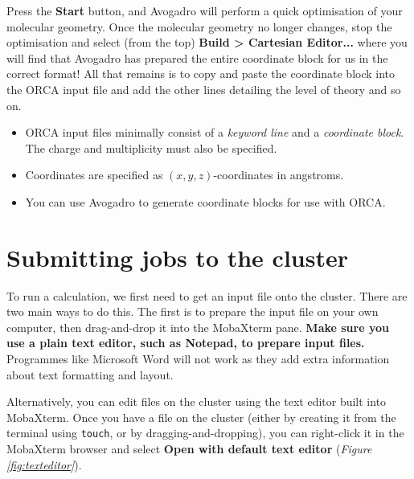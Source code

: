 \documentclass[10pt]{article}
\newcommand{\figref}[1]{\textit{Figure \ref{fig:#1}}}
\begin{document}
Press the \textbf{Start} button, and Avogadro will perform a quick optimisation of your molecular geometry. Once the molecular geometry no longer changes, stop the optimisation and select (from the top) \textbf{Build > Cartesian Editor...} where you will find that Avogadro has prepared the entire coordinate block for us in the correct format! All that remains is to copy and paste the coordinate block into the ORCA input file and add the other lines detailing the level of theory and so on.

\begin{summary}
    \begin{itemize}[leftmargin=0.6cm]
        \item ORCA input files minimally consist of a \textit{keyword line} and a \textit{coordinate block}. The charge and multiplicity must also be specified.
        \item Coordinates are specified as \((x, y, z)\)-coordinates in angstroms.
        \item You can use Avogadro to generate coordinate blocks for use with ORCA.
    \end{itemize}
\end{summary}


\section{Submitting jobs to the cluster}

To run a calculation, we first need to get an input file onto the cluster. There are two main ways to do this. The first is to prepare the input file on your own computer, then drag-and-drop it into the MobaXterm pane. \textbf{Make sure you use a plain text editor, such as Notepad, to prepare input files.} Programmes like Microsoft Word will not work as they add extra information about text formatting and layout.

Alternatively, you can edit files on the cluster using the text editor built into MobaXterm. Once you have a file on the cluster (either by creating it from the terminal using \texttt{touch}, or by dragging-and-dropping), you can right-click it in the MobaXterm browser and select \textbf{Open with default text editor} (\figref{texteditor}).
\end{document}
